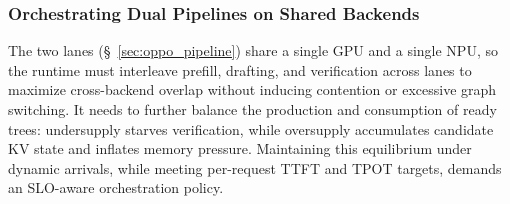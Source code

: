 \documentclass[sigconf,nonacm,10pt]{acmart}
\begin{document}
\subsubsection{Orchestrating Dual Pipelines on Shared Backends} \label{sec:challenge_pipeline}
The two lanes (\S~\ref{sec:oppo_pipeline}) share a single GPU and a single NPU, so the runtime must interleave prefill, drafting, and verification across lanes to maximize cross-backend overlap without inducing contention or excessive graph switching. It needs to further balance the production and consumption of ready trees: undersupply starves verification, while oversupply accumulates candidate KV state and inflates memory pressure. Maintaining this equilibrium under dynamic arrivals, while meeting per-request TTFT and TPOT targets, demands an SLO-aware orchestration policy.
\end{document}
